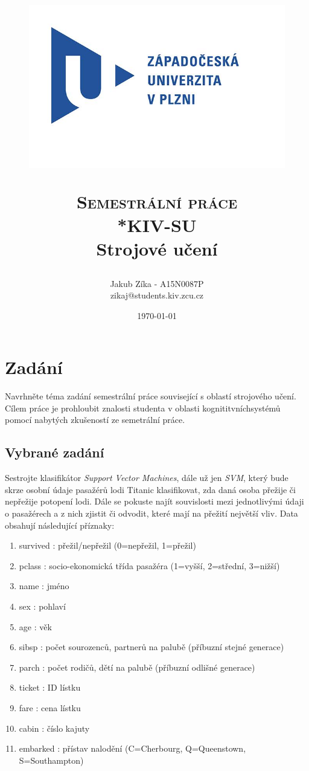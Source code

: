 \documentclass[a4]{article}
\title
{
\begin{figure}[h]
\includegraphics[scale=0.5]{zcuLogo}
\centering
\end{figure}
\textsc{\Huge{Semestrální práce}}\\*\LARGE{KIV-SU}\\\textbf{\huge{Strojové učení}}
}
\author{Jakub Zíka - A15N0087P\\zikaj@students.kiv.zcu.cz}
\date{\today}
\begin{document}
\maketitle
\newpage

\tableofcontents{}
\newpage

\section{Zadání}
Navrhněte téma zadání semestrální práce související s oblastí strojového učení. Cílem práce je prohloubit znalosti studenta v oblasti kognititvníchsystémů pomocí nabytých zkušeností ze semetrální práce.

\subsection{Vybrané zadání}
Sestrojte klasifikátor \textit{Support Vector Machines}, dále už jen \textit{SVM}, který bude skrze osobní údaje pasažérů lodi Titanic klasifikovat, zda daná osoba přežije či nepřežije potopení lodi. Dále se pokuste najít souvislosti mezi jednotlivými údaji o pasažérech a z nich zjistit či odvodit, které mají na přežití největší vliv. Data obsahují následující příznaky:

\begin{enumerate}
	\item survived : přežil/nepřežil (0=nepřežil, 1=přežil)
	\item pclass : socio-ekonomická třída pasažéra (1=vyšší, 2=střední, 3=nižší)
	\item name : jméno
	\item sex : pohlaví
	\item age : věk
	\item sibsp : počet sourozenců, partnerů na palubě (příbuzní stejné generace)
	\item parch : počet rodičů, dětí na palubě (příbuzní odlišné generace)
	\item ticket : ID lístku
	\item fare : cena lístku
	\item cabin : číslo kajuty
	\item embarked : přístav nalodění (C=Cherbourg, Q=Queenstown, S=Southampton)
\end{enumerate}
\end{document}
